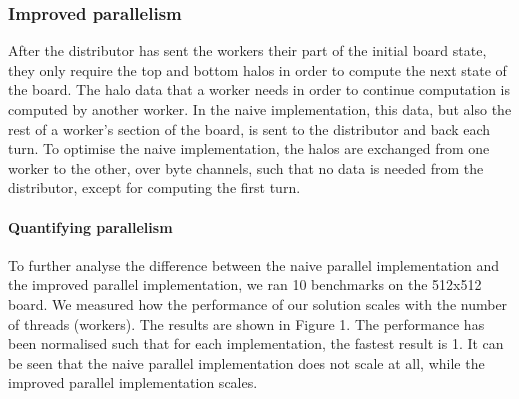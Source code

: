 \documentclass[a4, 11pt]{article}
\begin{document}
\begin{multicols}{2}
\subsubsection{Improved parallelism}

After the distributor has sent the workers their part of the initial board state, they only require the top and bottom halos in order to compute the next state of the board. The halo data that a worker needs in order to continue computation is computed by another worker. In the naive implementation, this data, but also the rest of a worker's section of the board, is sent to the distributor and back each turn. To optimise the naive implementation, the halos are exchanged from one worker to the other, over byte channels, such that no data is needed from the distributor, except for computing the first turn.

\paragraph{Quantifying parallelism}
To further analyse the difference between the naive parallel implementation and the improved parallel implementation, we ran 10 benchmarks on the 512x512 board. We measured how the performance of our solution scales with the number of threads (workers). The results are shown in Figure 1. The performance has been normalised such that for each implementation, the fastest result is 1. It can be seen that the naive parallel implementation does not scale at all, while the improved parallel implementation scales.


\vspace{0.5cm}


\end{multicols}
\end{document}
